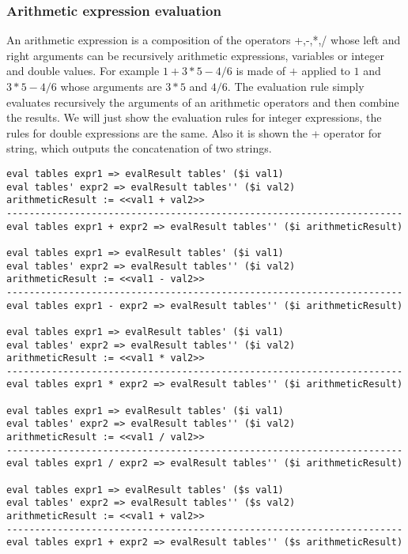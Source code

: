 \subsubsection{Arithmetic expression evaluation}

An arithmetic expression is a composition of the operators +,-,*,/ whose left and right arguments can be recursively arithmetic expressions, variables or integer and double values. For example $1 + 3 * 5 - 4 / 6$ is made of $+$ applied to $1$ and $3 * 5 - 4 / 6$ whose arguments are $3 * 5$ and $4 / 6$. The evaluation rule simply evaluates recursively the arguments of an arithmetic operators and then combine the results. We will just show the evaluation rules for integer expressions, the rules for double expressions are the same. Also it is shown the + operator for string, which outputs the concatenation of two strings.

\begin{lstlisting}
eval tables expr1 => evalResult tables' ($i val1)
eval tables' expr2 => evalResult tables'' ($i val2)
arithmeticResult := <<val1 + val2>>
----------------------------------------------------------------------
eval tables expr1 + expr2 => evalResult tables'' ($i arithmeticResult)

eval tables expr1 => evalResult tables' ($i val1)
eval tables' expr2 => evalResult tables'' ($i val2)
arithmeticResult := <<val1 - val2>>
----------------------------------------------------------------------
eval tables expr1 - expr2 => evalResult tables'' ($i arithmeticResult)

eval tables expr1 => evalResult tables' ($i val1)
eval tables' expr2 => evalResult tables'' ($i val2)
arithmeticResult := <<val1 * val2>>
----------------------------------------------------------------------
eval tables expr1 * expr2 => evalResult tables'' ($i arithmeticResult)

eval tables expr1 => evalResult tables' ($i val1)
eval tables' expr2 => evalResult tables'' ($i val2)
arithmeticResult := <<val1 / val2>>
----------------------------------------------------------------------
eval tables expr1 / expr2 => evalResult tables'' ($i arithmeticResult)

eval tables expr1 => evalResult tables' ($s val1)
eval tables' expr2 => evalResult tables'' ($s val2)
arithmeticResult := <<val1 + val2>>
----------------------------------------------------------------------
eval tables expr1 + expr2 => evalResult tables'' ($s arithmeticResult)
\end{lstlisting}

